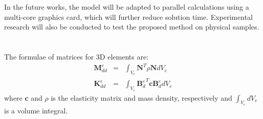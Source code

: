 \documentclass[materials,article,submit,moreauthors,pdftex]{Definitions/mdpi}
\begin{document}
{In the future works, the model will be adapted to parallel calculations using a multi-core graphics card, which will further reduce solution time. Experimental research will also be conducted to test the proposed method on physical samples.


\appendix
\section{}
\label{app:matrices}
The formulae of matrices for 3D elements are:
\begin{eqnarray}
\textbf{M}_{dd}^e & = & \int_{V_e}\textbf{N}^T\rho \textbf{N} dV_e\\
\textbf{K}_{dd}^e & = & \int_{V_e}{\textbf{B}_d^e}^T\textbf{c}\textbf{B}_d^edV_e
\end{eqnarray}
where \textbf{c} and \(\rho\) is the elasticity matrix and mass density, respectively and \(\int_{V_e}dV_e\) is a volume integral.

}
\end{document}
